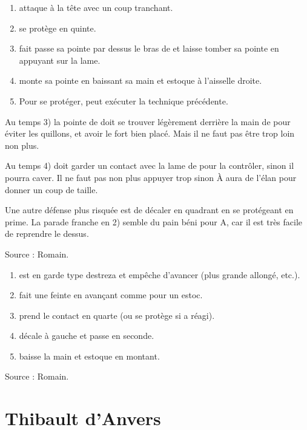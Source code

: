 \begin{technique}

\begin{enumerate}
	\item \A attaque \D à la tête avec un coup tranchant.
	\item \D se protège en quinte.
	\item \D fait passe sa pointe par dessus le bras de \A et laisse tomber sa pointe en appuyant sur la lame.
	\item \D monte sa pointe en baissant sa main et estoque \A à l'aisselle droite.
	\item Pour se protéger, \A peut exécuter la technique précédente.
\end{enumerate}

Au temps 3) la pointe de \D doit se trouver légèrement derrière la main de \A pour éviter les quillons, et avoir le fort bien placé. Mais il ne faut pas être trop loin non plus.

Au temps 4) \D doit garder un contact avec la lame de \A pour la contrôler, sinon il pourra caver. Il ne faut pas non plus appuyer trop sinon À aura de l'élan pour donner un coup de taille.

Une autre défense plus risquée est de décaler en quadrant en se protégeant en prime.
La parade franche en 2) semble du pain béni pour A, car il est très facile de reprendre le dessus.

Source : Romain.

\end{technique}


\begin{technique}

\begin{enumerate}
	\item \A est en garde type destreza et empêche \D d'avancer (plus grande allongé, etc.).
	\item \D fait une feinte en avançant comme pour un estoc.
	\item \D prend le contact en quarte (ou se protège si \A a réagi).
	\item \D décale à gauche et passe en seconde.
	\item \D baisse la main et estoque en montant.
\end{enumerate}

Source : Romain.

\end{technique}


\section{Thibault d'Anvers}


